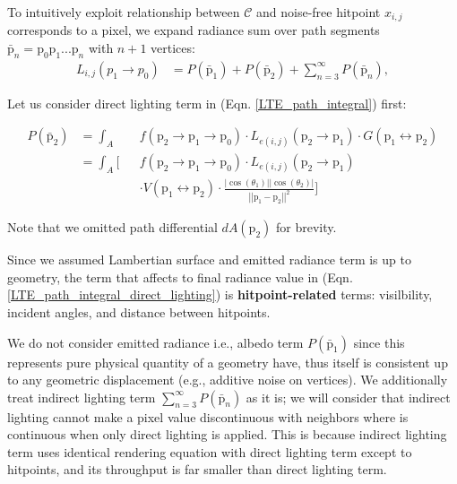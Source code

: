 To intuitively exploit relationship between $\mathcal{C}$ and noise-free hitpoint $x_{i,j}$ corresponds to a pixel, we expand radiance sum over path segments $\bar{\mathrm{p}}_n=\mathrm{p}_0\mathrm{p}_1...\mathrm{p}_n$ with $n+1$ vertices:
\begin{align}
    L_{i,j}\left(p_1\rightarrow p_0\right)& = \mathit{P}\left(\bar{\mathrm{p}}_1\right)+\mathit{P}\left(\bar{\mathrm{p}}_2\right)+\sum_{n=3}^\infty \mathit{P}\left(\bar{\mathrm{p}}_n\right), 
    \label{LTE_path_integral}
\end{align}


Let us consider direct lighting term in (Eqn. \ref{LTE_path_integral}) first:

\begin{align}
    \mathit{P}\left(\bar{\mathrm{p}}_2\right) & = \int_A && f\left(\mathrm{p}_2\rightarrow \mathrm{p}_1 \rightarrow \mathrm{p}_0\right)\cdot L_{e(i,j)}\left(\mathrm{p}_2\rightarrow \mathrm{p}_1\right) \cdot G\left(\mathrm{p}_1 \leftrightarrow \mathrm{p}_2\right) \nonumber \\
    & = \int_A \Bigg[ && f\left(\mathrm{p}_2\rightarrow \mathrm{p}_1 \rightarrow \mathrm{p}_0\right)\cdot L_{e(i,j)}(\mathrm{p}_2\rightarrow \mathrm{p}_1) \nonumber \\ 
    & && \cdot V(\mathrm{p}_1 \leftrightarrow \mathrm{p}_2) \cdot \frac{\left|\cos(\theta_1)\right|\left|\cos(\theta_2)\right|}{\left|\left|\mathrm{p}_1-\mathrm{p}_2\right|\right|^2}\Bigg]
    \label{LTE_path_integral_direct_lighting}
\end{align}

Note that we omitted path differential $dA(\mathrm{p}_2)$ for brevity.

Since we assumed Lambertian surface and emitted radiance term is up to geometry, the term that affects to final radiance value in (Eqn. \ref{LTE_path_integral_direct_lighting}) is \textbf{hitpoint-related} terms: visilbility, incident angles, and distance between hitpoints.

We do not consider emitted radiance i.e., albedo term $\mathit{P}\left(\bar{\mathrm{p}}_1\right)$ since this represents pure physical quantity of a geometry have, thus itself is consistent up to any geometric displacement (e.g., additive noise on vertices).
We additionally treat indirect lighting term $\sum_{n=3}^\infty \mathit{P}(\bar{\mathrm{p}}_n)$ as it is; we will consider that indirect lighting cannot make a pixel value discontinuous with neighbors where is continuous when only direct lighting is applied. 
This is because indirect lighting term uses identical rendering equation with direct lighting term except to hitpoints, and its throughput is far smaller than direct lighting term.

